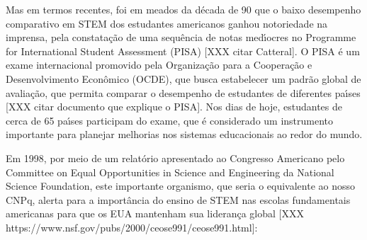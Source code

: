 \documentclass[
12pt,		%
openright,	%
twoside,  %
a4paper,			%
chapter=TITLE,		%
english,			%
french,				%
spanish,			%
brazil				%
]{USPSC-classe/USPSC}
\begin{document}
\noindent\begin{center}\mbox{\centering{}}\end{center}


Mas em termos recentes, foi em meados da d\'ecada de 90 que o baixo desempenho comparativo em STEM dos estudantes americanos ganhou notoriedade na imprensa, pela constata\c{c}\~ao de uma sequ\^encia de notas med\'{\i}ocres no Programme for International Student Assessment (PISA) [XXX citar Catteral]. O PISA \'e um exame internacional promovido pela Organiza\c{c}\~ao para a Coopera\c{c}\~ao e Desenvolvimento Econ\^omico (OCDE), que busca estabelecer um padr\~ao global de avalia\c{c}\~ao, que permita comparar o desempenho de estudantes de diferentes pa\'{\i}ses [XXX citar documento que explique o PISA]. Nos dias de hoje, estudantes de cerca de 65 pa\'{\i}ses participam do exame, que \'e considerado um instrumento importante para planejar melhorias nos sistemas educacionais ao redor do mundo.










Em 1998, por meio de um relat\'orio apresentado ao Congresso Americano pelo Committee on Equal Opportunities in Science and Engineering da National Science Foundation, este importante organismo, que seria o equivalente ao nosso CNPq, alerta para a import\^ancia do ensino de STEM nas escolas fundamentais americanas para que os EUA mantenham sua lideran\c{c}a global [XXX https://www.nsf.gov/pubs/2000/ceose991/ceose991.html]:











\noindent\begin{center}\mbox{\centering{}}\end{center}
\end{document}
